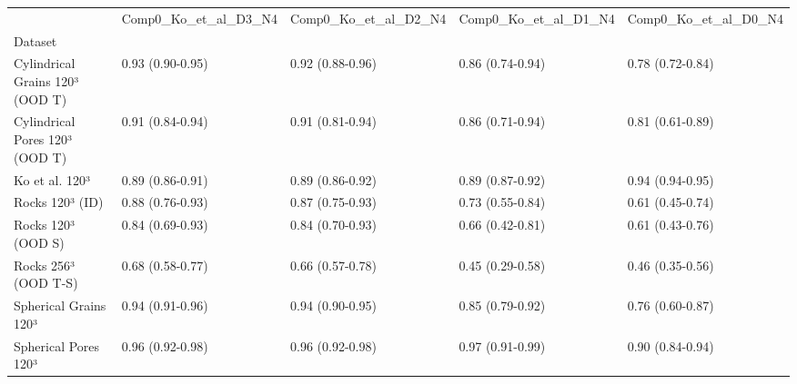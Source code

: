 \begin{tabular}{lllll}
\toprule
 & Comp0_Ko_et_al_D3_N4 & Comp0_Ko_et_al_D2_N4 & Comp0_Ko_et_al_D1_N4 & Comp0_Ko_et_al_D0_N4 \\
Dataset &  &  &  &  \\
\midrule
Cylindrical Grains 120³ (OOD T) & 0.93 (0.90-0.95) & 0.92 (0.88-0.96) & 0.86 (0.74-0.94) & 0.78 (0.72-0.84) \\
Cylindrical Pores 120³ (OOD T) & 0.91 (0.84-0.94) & 0.91 (0.81-0.94) & 0.86 (0.71-0.94) & 0.81 (0.61-0.89) \\
Ko et al. 120³ & 0.89 (0.86-0.91) & 0.89 (0.86-0.92) & 0.89 (0.87-0.92) & 0.94 (0.94-0.95) \\
Rocks 120³ (ID) & 0.88 (0.76-0.93) & 0.87 (0.75-0.93) & 0.73 (0.55-0.84) & 0.61 (0.45-0.74) \\
Rocks 120³ (OOD S) & 0.84 (0.69-0.93) & 0.84 (0.70-0.93) & 0.66 (0.42-0.81) & 0.61 (0.43-0.76) \\
Rocks 256³ (OOD T-S) & 0.68 (0.58-0.77) & 0.66 (0.57-0.78) & 0.45 (0.29-0.58) & 0.46 (0.35-0.56) \\
Spherical Grains 120³ & 0.94 (0.91-0.96) & 0.94 (0.90-0.95) & 0.85 (0.79-0.92) & 0.76 (0.60-0.87) \\
Spherical Pores 120³ & 0.96 (0.92-0.98) & 0.96 (0.92-0.98) & 0.97 (0.91-0.99) & 0.90 (0.84-0.94) \\
\bottomrule
\end{tabular}
